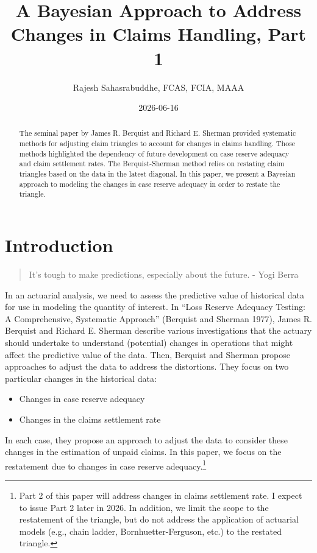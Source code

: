 \documentclass[
  letterpaper,
  DIV=11,
  numbers=noendperiod]{scrartcl}
\title{A Bayesian Approach to Address Changes in Claims Handling, Part
1}
\author{Rajesh Sahasrabuddhe, FCAS, FCIA, MAAA}
\date{2026-06-16}
\providecommand{\tightlist}{%
  \setlength{\itemsep}{0pt}\setlength{\parskip}{0pt}}
\renewcommand*\contentsname{Table of contents}
\newcommand\contentsname{Table of contents}
\begin{document}
\maketitle
\begin{abstract}
The seminal paper by James R. Berquist and Richard E. Sherman provided
systematic methods for adjusting claim triangles to account for changes
in claims handling. Those methods highlighted the dependency of future
development on case reserve adequacy and claim settlement rates. The
Berquist-Sherman method relies on restating claim triangles based on the
data in the latest diagonal. In this paper, we present a Bayesian
approach to modeling the changes in case reserve adequacy in order to
restate the triangle.
\end{abstract}

\renewcommand*\contentsname{Table of contents}
{
\setcounter{tocdepth}{3}
\tableofcontents
}

\newcommand*{\bs}{Berquist-Sherman }

\section{Introduction}\label{introduction}

\begin{quote}
It's tough to make predictions, especially about the future.   
- Yogi Berra
\end{quote}

In an actuarial analysis, we need to assess the predictive value of
historical data for use in modeling the quantity of interest. In ``Loss
Reserve Adequacy Testing: A Comprehensive, Systematic Approach''
(Berquist and Sherman 1977), James R. Berquist and Richard E. Sherman
describe various investigations that the actuary should undertake to
understand (potential) changes in operations that might affect the
predictive value of the data. Then, Berquist and Sherman propose
approaches to adjust the data to address the distortions. They focus on
two particular changes in the historical data:

\begin{itemize}
\tightlist
\item
  Changes in case reserve adequacy
\item
  Changes in the claims settlement rate
\end{itemize}

In each case, they propose an approach to adjust the data to consider
these changes in the estimation of unpaid claims. In this paper, we
focus on the restatement due to changes in case reserve
adequacy.\footnote{Part 2 of this paper will address changes in claims
  settlement rate. I expect to issue Part 2 later in 2026. In addition,
  we limit the scope to the restatement of the triangle, but do not
  address the application of actuarial models (e.g., chain ladder,
  Bornhuetter-Ferguson, etc.) to the restated triangle.}
\end{document}
